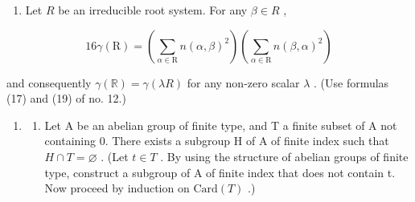 \begin{enumerate}
  Let \(\Gamma\) be a free \(\mathbf{Z}\) -module of finite rank \(l\) , \(\Gamma^{*}\) the dual \(\mathbf{Z}\) -module, I a finite set of indices, \((x_{i}, x_{i}^{*})_{i \in \mathbf{I}}\) a family of elements of \(\Gamma \times \Gamma^{*}\) such that \(\langle x_{i}, x_{i}^{*} \rangle = 2\) for all \(i \in \mathbf{I}\) , \(s_{i} = s_{x_{i}, x_{i}^{*}}\) . Let \(\mathbf{V}\) be the real vector space \(\Gamma \otimes_{\mathbf{Z}} \mathbf{R}\) , whose dual \(\mathbf{V}^{*}\) can be identified with \(\Gamma^{*} \otimes_{\mathbf{Z}} \mathbf{R}\) . We also denote by \(s_{i}\) the reflection \(s_{i} \otimes 1\) in \(\mathbf{V}\) . Let \(\mathbf{R}\) (resp. \(\mathbf{R}'\) ) be the set of \(x_{i}\) (resp. \(x_{i}^{*}\) ). Let \(\mathbf{E}\) (resp. \(\mathbf{E}'\) ) be the subspace of \(\mathbf{V}\) (resp. \(\mathbf{V}^{*}\) ) generated by \(\mathbf{R}\) (resp. \(\mathbf{R}'\) ). Assume that \(s_{i}(\mathbf{R}) = \mathbf{R}\) for all \(i\) . Then, \(\mathbf{R}\) is a root system in \(\mathbf{E}\) . \(\mathbf{E}'\) is canonically identified with the dual of \(\mathbf{E}\) and \(x_{i}^{*}\) with \(x_{i}^{-}\) for all \(i\) . If \(\mathbf{F}\) (resp. \(\mathbf{F}'\)) is the subspace of \(\mathbf{V}\) (resp. \(\mathbf{V}^{*}\) ) consisting of the points invariant under all the \(s_{i}\) (resp. \(^t s_{i}\) ), then \(\Gamma \cap \mathbf{F}\) (resp. \(\Gamma^{*} \cap \mathbf{F}'\) ) generates \(\mathbf{F}\) (resp. \(\mathbf{F}'\) ). If we put \(\Gamma_{1} = (\Gamma \cap \mathbf{E}) \oplus (\Gamma \cap \mathbf{F})\) (resp. \(\Gamma_{1}^{*} = (\Gamma^{*} \cap \mathbf{E}') \oplus (\Gamma^{*} \cap \mathbf{F}')\) ), then \(\Gamma / \Gamma_{1}\) and \(\Gamma^{*} / \Gamma_{1}^{*}\) are isomorphic finite groups.
\item
  Let \(R\) be an irreducible root system. For any \(\beta \in R\) ,
\end{enumerate}

\[
16 \gamma (\mathrm{R}) = (\sum_ {\alpha \in \mathrm{R}} n (\alpha , \beta) ^ {2}) (\sum_ {\alpha \in \mathrm{R}} n (\beta , \alpha) ^ {2})
\]

and consequently \(\gamma (\mathbb{R}) = \gamma (\lambda R)\) for any non-zero scalar \(\lambda\) . (Use formulas (17) and (19) of no. 12.)

\begin{enumerate}
\def\labelenumi{\arabic{enumi})}
\setcounter{enumi}{5}
\tightlist
\item
  \begin{enumerate}
  \def\labelenumii{\alph{enumii})}
  \tightlist
  \item
    Let A be an abelian group of finite type, and T a finite subset of A not containing 0. There exists a subgroup H of A of finite index such that \(H \cap T = \varnothing\) . (Let \(t \in T\) . By using the structure of abelian groups of finite type, construct a subgroup of A of finite index that does not contain t. Now proceed by induction on \(\text{Card}(T)\) .)
  \end{enumerate}
\end{enumerate}

